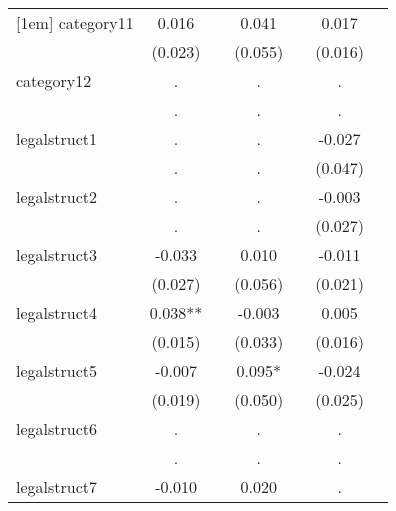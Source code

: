 {\begin{tabular}{l*{6}{c}}
[1em]
category11  &       0.016   &               &       0.041   &               &       0.017   &               \\
            &     (0.023)   &               &     (0.055)   &               &     (0.016)   &               \\
[1em]
category12  &           .   &               &           .   &               &           .   &               \\
            &           .   &               &           .   &               &           .   &               \\
[1em]
legalstruct1&           .   &               &           .   &               &      -0.027   &               \\
            &           .   &               &           .   &               &     (0.047)   &               \\
[1em]
legalstruct2&           .   &               &           .   &               &      -0.003   &               \\
            &           .   &               &           .   &               &     (0.027)   &               \\
[1em]
legalstruct3&      -0.033   &               &       0.010   &               &      -0.011   &               \\
            &     (0.027)   &               &     (0.056)   &               &     (0.021)   &               \\
[1em]
legalstruct4&       0.038** &               &      -0.003   &               &       0.005   &               \\
            &     (0.015)   &               &     (0.033)   &               &     (0.016)   &               \\
[1em]
legalstruct5&      -0.007   &               &       0.095*  &               &      -0.024   &               \\
            &     (0.019)   &               &     (0.050)   &               &     (0.025)   &               \\
[1em]
legalstruct6&           .   &               &           .   &               &           .   &               \\
            &           .   &               &           .   &               &           .   &               \\
[1em]
legalstruct7&      -0.010   &               &       0.020   &               &           .   &               \\

\end{tabular}}
